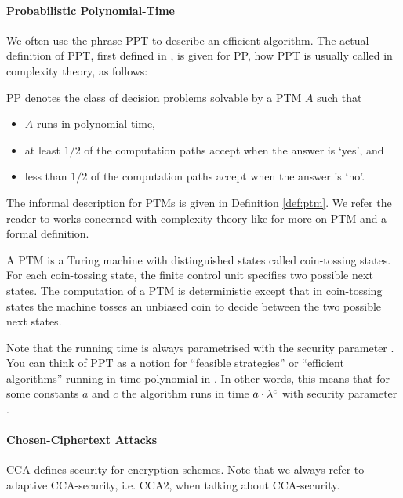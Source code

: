 \paragraph{Probabilistic Polynomial-Time}
We often use the phrase \ac{PPT} to describe an efficient algorithm.
The actual definition of \ac{PPT}, first defined in \cite{gill1977}, is given for \ac{PP}, how \ac{PPT} is usually called in complexity theory, as follows:

\begin{definition}[\acl{PP}]\label{def:ppt}
\ac{PP} denotes the class of decision problems solvable by a \ac{PTM} $A$ such that
\begin{itemize}
	\item $A$ runs in polynomial-time,
	\item at least $1/2$ of the computation paths accept when the answer is `yes', and
	\item less than $1/2$ of the computation paths accept when the answer is `no'. \eod
\end{itemize}
\end{definition}

\noindent
The informal description for \aclp{PTM} is given in Definition \ref{def:ptm}.
We refer the reader to works concerned with complexity theory like \cite{santos1969,WaterlooComplexity} for more on \ac{PTM} and a formal definition.

\begin{definition}\label{def:ptm}
A \ac{PTM} is a Turing machine with distinguished states called coin-tossing states.
For each coin-tossing state, the finite control unit specifies two possible next states.
The computation of a \ac{PTM} is deterministic except that in coin-tossing states the machine tosses an unbiased coin to decide between the two possible next states.
\end{definition}

\noindent
Note that the running time is always parametrised with the security parameter \secpar.
You can think of \ac{PPT} as a notion for ``feasible strategies'' or ``efficient algorithms'' running in time polynomial in \secpar.
In other words, this means that for some constants $a$ and $c$ the algorithm runs in time $a\cdot \lambda^c$ with security parameter \secpar \cite{katz2008introduction}.

\paragraph{Chosen-Ciphertext Attacks}
\ac{CCA} defines security for encryption schemes.
Note that we always refer to adaptive \ac{CCA}-security, i.e. \ac{CCA}2, when talking about \ac{CCA}-security.

